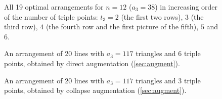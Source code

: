 \newcommand\ntw[1]{\begin{minipage}{0.2425\linewidth}\end{minipage}}

\begin{figure}[p]
\noindent\ntw{05}\ngap\ntw{06}\ngap\ntw{09}\ngap\ntw{13}\par\vspace{1mm}
\noindent\ntw{14}\ngap\ntw{15}\ngap\ntw{17}\ngap\ntw{18}\par\vspace{1mm}
\noindent\ntw{02}\ngap\ntw{08}\ngap\ntw{16}\ngap\ntw{19}\par\vspace{1mm}
\noindent\ntw{01}\ngap\ntw{03}\ngap\ntw{04}\ngap\ntw{11}\par\vspace{1mm}
\noindent\ntw{12}\ngap\ntw{10}\ngap\ntw{07}
\caption{All 19 optimal arrangements for $n=12$ ($a_3=38$) in increasing order of the number of triple points: $t_3=2$ (the first two rows), $3$ (the third row), $4$ (the fourth row and the first picture of the fifth), $5$ and $6$.}
\label{fig:n12-all}
\end{figure}

\begin{figure}[p]
\noindent
\caption{An arrangement of 20 lines with $a_3=117$ triangles and 6 triple points, obtained by direct augmentation (\cref{sec:augment}).}
\label{fig:n20}
\end{figure}

\begin{figure}[p]
\noindent
\caption{An arrangement of 20 lines with $a_3=117$ triangles and 3 triple points, obtained by collapse augmentation (\cref{sec:augment}).}
\label{fig:n20-collapse}
\end{figure}

